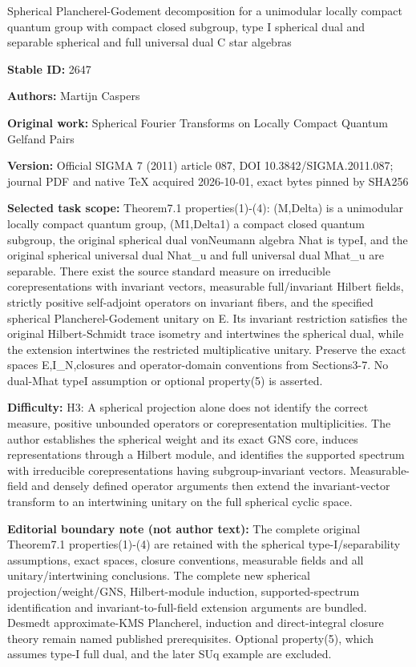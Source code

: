 \documentclass[11pt]{article}
\numberwithin{equation}{section}
\theoremstyle{definition}
\begin{document}
\begin{center}\Large Spherical Plancherel-Godement decomposition for a unimodular locally compact quantum group with compact closed subgroup, type I spherical dual and separable spherical and full universal dual C star algebras\end{center}
\noindent\textbf{Stable ID:} 2647\par
\noindent\textbf{Authors:} Martijn Caspers\par
\noindent\textbf{Original work:} Spherical Fourier Transforms on Locally Compact Quantum Gelfand Pairs\par
\noindent\textbf{Version:} Official SIGMA 7 (2011) article 087, DOI 10.3842/SIGMA.2011.087; journal PDF and native TeX acquired 2026-10-01, exact bytes pinned by SHA256\par
\noindent\textbf{Selected task scope:} Theorem7.1 properties(1)-(4): (M,Delta) is a unimodular locally compact quantum group, (M1,Delta1) a compact closed quantum subgroup, the original spherical dual vonNeumann algebra Nhat is typeI, and the original spherical universal dual Nhat\_u and full universal dual Mhat\_u are separable. There exist the source standard measure on irreducible corepresentations with invariant vectors, measurable full/invariant Hilbert fields, strictly positive self-adjoint operators on invariant fibers, and the specified spherical Plancherel-Godement unitary on E. Its invariant restriction satisfies the original Hilbert-Schmidt trace isometry and intertwines the spherical dual, while the extension intertwines the restricted multiplicative unitary. Preserve the exact spaces E,I\_N,closures and operator-domain conventions from Sections3-7. No dual-Mhat typeI assumption or optional property(5) is asserted.\par
\noindent\textbf{Difficulty:} H3: A spherical projection alone does not identify the correct measure, positive unbounded operators or corepresentation multiplicities. The author establishes the spherical weight and its exact GNS core, induces representations through a Hilbert module, and identifies the supported spectrum with irreducible corepresentations having subgroup-invariant vectors. Measurable-field and densely defined operator arguments then extend the invariant-vector transform to an intertwining unitary on the full spherical cyclic space.\par
\noindent\textbf{Editorial boundary note (not author text):} The complete original Theorem7.1 properties(1)-(4) are retained with the spherical type-I/separability assumptions, exact spaces, closure conventions, measurable fields and all unitary/intertwining conclusions. The complete new spherical projection/weight/GNS, Hilbert-module induction, supported-spectrum identification and invariant-to-full-field extension arguments are bundled. Desmedt approximate-KMS Plancherel, induction and direct-integral closure theory remain named published prerequisites. Optional property(5), which assumes type-I full dual, and the later SUq example are excluded.\par
\end{document}
